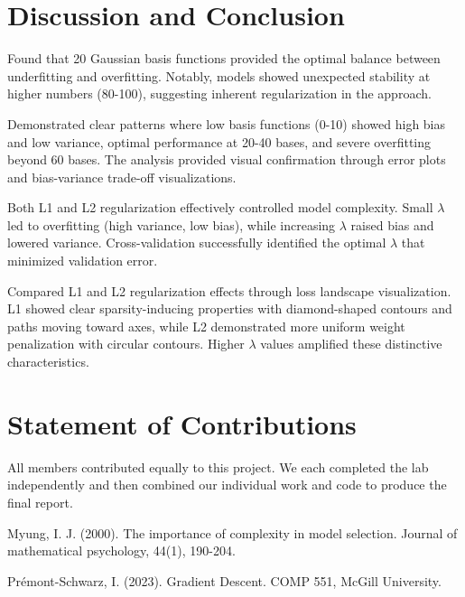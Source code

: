 \documentclass{article}
\begin{document}
\section{Discussion and Conclusion}

Found that 20 Gaussian basis functions provided the optimal balance between underfitting and overfitting. Notably, models showed unexpected stability at higher numbers (80-100), suggesting inherent regularization in the approach.

Demonstrated clear patterns where low basis functions (0-10) showed high bias and low variance, optimal performance at 20-40 bases, and severe overfitting beyond 60 bases. The analysis provided visual confirmation through error plots and bias-variance trade-off visualizations.

Both L1 and L2 regularization effectively controlled model complexity. Small $\lambda$ led to overfitting (high variance, low bias), while increasing $\lambda$ raised bias and lowered variance. Cross-validation successfully identified the optimal $\lambda$ that minimized validation error.

Compared L1 and L2 regularization effects through loss landscape visualization. L1 showed clear sparsity-inducing properties with diamond-shaped contours and paths moving toward axes, while L2 demonstrated more uniform weight penalization with circular contours. Higher $\lambda$ values amplified these distinctive characteristics.

\section{Statement of Contributions}

All members contributed equally to this project. We each completed the lab independently and then combined our individual work and code to produce the final report.

\newpage
  

\begin{thebibliography}{1}

 Myung, I. J. (2000). The importance of complexity in model selection. Journal of mathematical psychology, 44(1), 190-204.
\label{model_complexity}

 Prémont-Schwarz, I. (2023). Gradient Descent. COMP 551, McGill University.\label{ref:lectures}


\end{thebibliography}
\end{document}
